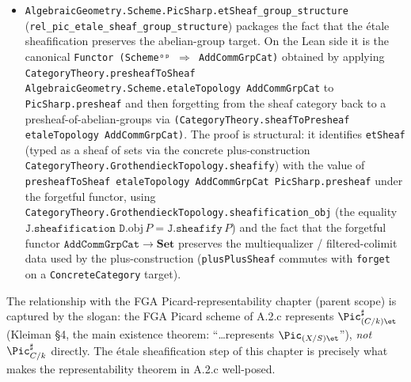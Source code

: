 \begin{itemize}
    instance for the pair \texttt{(etaleTopology, AddCommGrpCat)} is
    missing at the pinned Mathlib commit, the project-side fallback
    combines the concrete set-valued sheafification
    \texttt{CategoryTheory.GrothendieckTopology.sheafify} (module
    \texttt{Mathlib.CategoryTheory.Sites.ConcreteSheafification}) with
    the colimit-preservation of the forgetful functor
    \(\texttt{AddCommGrpCat} \to \mathbf{Set}\) and the
    \texttt{plusPlusSheaf} plus-construction on the underlying
    set-valued presheaf, transported back through the
    \texttt{ConcreteCategory} instance on \texttt{AddCommGrpCat}.
  \item \texttt{AlgebraicGeometry.Scheme.PicSharp.etSheaf\_group\_structure}
    (\texttt{rel\_pic\_etale\_sheaf\_group\_structure}) packages the fact
    that the \'etale sheafification preserves the abelian-group target.
    On the Lean side it is the canonical
    \texttt{Functor (Schemeᵒᵖ \(\Rightarrow\) AddCommGrpCat)}
    obtained by applying
    \texttt{CategoryTheory.presheafToSheaf
    AlgebraicGeometry.Scheme.etaleTopology AddCommGrpCat} to
    \texttt{PicSharp.presheaf} and then forgetting from the sheaf
    category back to a presheaf-of-abelian-groups via
    \texttt{(CategoryTheory.sheafToPresheaf etaleTopology
    AddCommGrpCat)}. The proof is structural: it identifies
    \texttt{etSheaf} (typed as a sheaf of sets via the concrete
    plus-construction
    \texttt{CategoryTheory.GrothendieckTopology.sheafify}) with the
    value of \texttt{presheafToSheaf etaleTopology AddCommGrpCat
    PicSharp.presheaf} under the forgetful functor, using
    \texttt{CategoryTheory.GrothendieckTopology.sheafification\_obj}
    (the equality \(\texttt{J.sheafification D}.\mathrm{obj}\, P =
    \texttt{J.sheafify}\, P\)) and the fact that the forgetful functor
    \(\texttt{AddCommGrpCat} \to \mathbf{Set}\) preserves the
    multiequalizer / filtered-colimit data used by the
    plus-construction (\texttt{plusPlusSheaf} commutes with
    \texttt{forget} on a \texttt{ConcreteCategory} target).
\end{itemize}

The relationship with the FGA Picard-representability chapter (parent scope) is captured by
the slogan: the FGA Picard scheme of A.2.c represents
\(\Pic^\sharp_{(C/k)\et}\) (Kleiman \S 4, the main existence theorem: ``\dots represents
\(\Pic_{(X/S)\et}\)''), \emph{not} \(\Pic^\sharp_{C/k}\) directly. The \'etale
sheafification step of this chapter is precisely what makes the
representability theorem in A.2.c well-posed.

